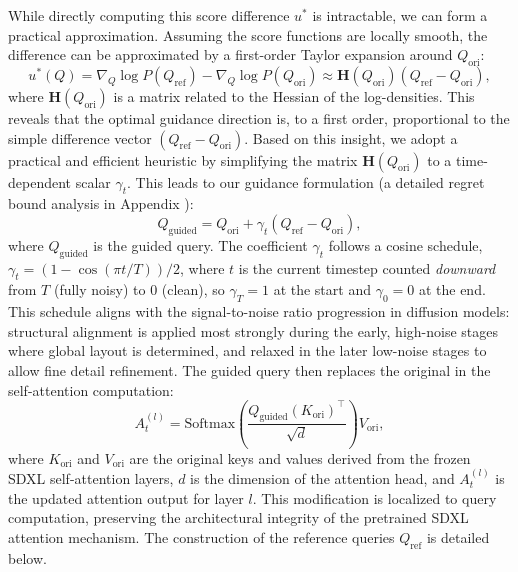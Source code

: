 While directly computing this score difference $u^*$ is intractable, we can form a practical approximation. Assuming the score functions are locally smooth, the difference can be approximated by a first-order Taylor expansion around $Q_\text{ori}$:
\begin{equation}
    u^*(Q) = \nabla_Q \log P(Q_\text{ref}) - \nabla_Q \log P(Q_\text{ori}) \approx \mathbf{H}(Q_\text{ori}) (Q_\text{ref} - Q_\text{ori}),
    \label{eq:taylor_approx}
\end{equation}
where $\mathbf{H}(Q_\text{ori})$ is a matrix related to the Hessian of the log-densities. This reveals that the optimal guidance direction is, to a first order, proportional to the simple difference vector $(Q_\text{ref} - Q_\text{ori})$.
Based on this insight, we adopt a practical and efficient heuristic by simplifying the matrix $\mathbf{H}(Q_\text{ori})$ to a time-dependent scalar $\gamma_t$. This leads to our guidance formulation (a detailed regret bound analysis in Appendix ):
\begin{equation}
    Q_\text{guided} = Q_\text{ori} + \gamma_t (Q_\text{ref} - Q_\text{ori}),
    \label{eq:rsag_update}
\end{equation}
where $Q_\text{guided}$ is the guided query. The coefficient $\gamma_t$ follows a cosine schedule, $\gamma_t = (1 - \cos(\pi t / T))/2$, where $t$ is the current timestep counted \emph{downward} from $T$ (fully noisy) to $0$ (clean), so $\gamma_T = 1$ at the start and $\gamma_0 = 0$ at the end. This schedule aligns with the signal-to-noise ratio progression in diffusion models: structural alignment is applied most strongly during the early, high-noise stages where global layout is determined, and relaxed in the later low-noise stages to allow fine detail refinement. The guided query then replaces the original in the self-attention computation:
\begin{equation}
    A_t^{(l)} = \text{Softmax}\!\left(\frac{Q_\text{guided} (K_\text{ori})^\top}{\sqrt{d}}\right) V_\text{ori},
\end{equation}
where $K_\text{ori}$ and $V_\text{ori}$ are the original keys and values derived from the frozen SDXL self-attention layers, $d$ is the dimension of the attention head, and $A_t^{(l)}$ is the updated attention output for layer $l$. This modification is localized to query computation, preserving the architectural integrity of the pretrained SDXL attention mechanism. The construction of the reference queries $Q_\text{ref}$ is detailed below.

